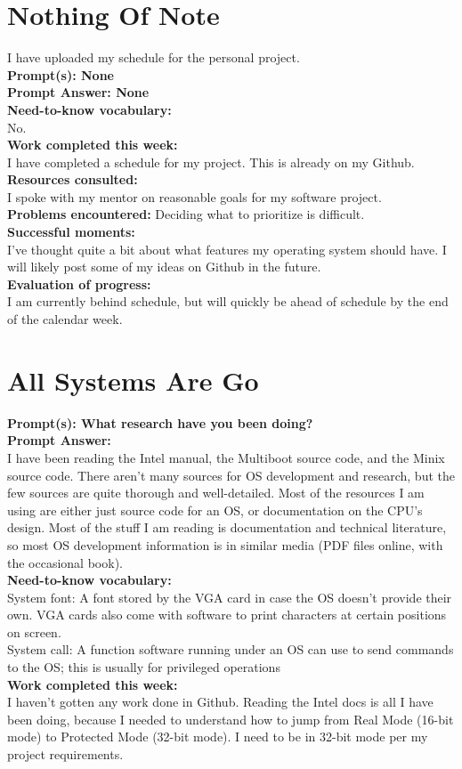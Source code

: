 \documentclass[11pt]{article}
\begin{document}
\section{Nothing Of Note}
I have uploaded my schedule for the personal project.\\
\textbf{Prompt(s): None}\\
\textbf{Prompt Answer: None}\\
\textbf{Need-to-know vocabulary:}\\
No.\\
\textbf{Work completed this week:}\\
I have completed a schedule for my project. This is already on my Github.\\
\textbf{Resources consulted:}\\
I spoke with my mentor on reasonable goals for my software project.\\
\textbf{Problems encountered:}
Deciding what to prioritize is difficult.\\
\textbf{Successful moments:}\\
I've thought quite a bit about what features my operating system should have. I will likely post some of my ideas on Github in the future.\\
\textbf{Evaluation of progress:}\\
I am currently behind schedule, but will quickly be ahead of schedule by the end of the calendar week.
\section{All Systems Are Go}
\textbf{Prompt(s): What research have you been doing?}\\
\textbf{Prompt Answer:}\\
I have been reading the Intel manual, the Multiboot source code, and the Minix source code. There aren't many sources for OS development and research, but the few sources are quite thorough and well-detailed. Most of the resources I am using are either just source code for an OS, or documentation on the CPU's design. Most of the stuff I am reading is documentation and technical literature, so most OS development information is in similar media (PDF files online, with the occasional book).\\
\textbf{Need-to-know vocabulary:}\\
System font: A font stored by the VGA card in case the OS doesn't provide their own. VGA cards also come with software to print characters at certain positions on screen.\\
System call: A function software running under an OS can use to send commands to the OS; this is usually for privileged operations\\
\textbf{Work completed this week:}\\
I haven't gotten any work done in Github. Reading the Intel docs is all I have been doing, because I needed to understand how to jump from Real Mode (16-bit mode) to Protected Mode (32-bit mode). I need to be in 32-bit mode per my project requirements.
\end{document}
